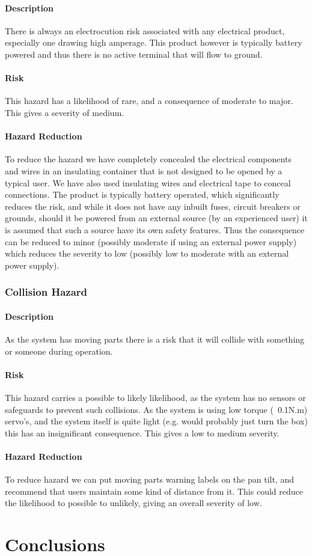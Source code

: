 \documentclass[]{report}
\begin{document}
\subsubsection{Description}
There is always an electrocution risk associated with any electrical product, especially one drawing high amperage. This product however is typically battery powered and thus there is no active terminal that will flow to ground.

\subsubsection{Risk}
This hazard has a likelihood of rare, and a consequence of moderate to major. This gives a severity of medium.

\subsubsection{Hazard Reduction}
To reduce the hazard we have completely concealed the electrical components and wires in an insulating container that is not designed to be opened by a typical user. We have also used insulating wires and electrical tape to conceal connections. The product is typically battery operated, which significantly reduces the risk, and while it does not have any inbuilt fuses, circuit breakers or grounds, should it be powered from an external source (by an experienced user) it is assumed that such a source have its own safety features. Thus the consequence can be reduced to minor (possibly moderate if using an external power supply) which reduces the severity to low (possibly low to moderate with an external power supply).

\subsection{Collision Hazard}
\subsubsection{Description}
As the system has moving parts there is a risk that it will collide with something or someone during operation.

\subsubsection{Risk}
This hazard carries a possible to likely likelihood, as the system has no sensors or safeguards to prevent such collisions. As the system is using low torque (~0.1N.m) servo's, and the system itself is quite light (e.g. would probably just turn the box) this has an insignificant consequence. This gives a low to medium severity.

\subsubsection{Hazard Reduction}
To reduce hazard we can put moving parts warning labels on the pan tilt, and recommend that users maintain some kind of distance from it. This could reduce the likelihood to possible to unlikely, giving an overall severity of low.

\chapter{Conclusions}
\end{document}
